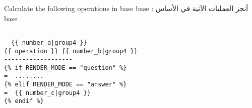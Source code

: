 Calculate  the following operations in base {{ base }} :  أنجز العمليات الآتية في الأساس {{ base }}

\begin{verbatim}

  {{ number_a|group4 }}
{{ operation }} {{ number_b|group4 }}
-------------------
{% if RENDER_MODE == "question" %}
=  ........
{% elif RENDER_MODE == "answer" %}
=  {{ number_c|group4 }}
{% endif %}

\end{verbatim}
